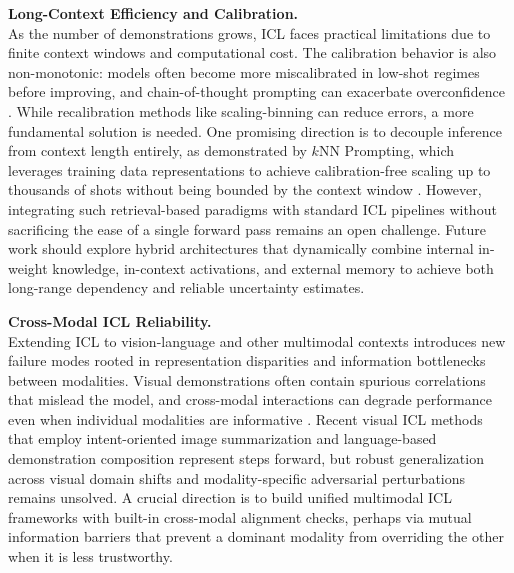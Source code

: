 \documentclass[11pt]{article}
\begin{document}
\textbf{Long-Context Efficiency and Calibration.}\\
As the number of demonstrations grows, ICL faces practical limitations due to finite context windows and computational cost. The calibration behavior is also non-monotonic: models often become more miscalibrated in low-shot regimes before improving, and chain-of-thought prompting can exacerbate overconfidence \cite{ref88}. While recalibration methods like scaling-binning can reduce errors, a more fundamental solution is needed. One promising direction is to decouple inference from context length entirely, as demonstrated by \(k\)NN Prompting, which leverages training data representations to achieve calibration-free scaling up to thousands of shots without being bounded by the context window \cite{ref188}. However, integrating such retrieval-based paradigms with standard ICL pipelines without sacrificing the ease of a single forward pass remains an open challenge. Future work should explore hybrid architectures that dynamically combine internal in-weight knowledge, in-context activations, and external memory to achieve both long-range dependency and reliable uncertainty estimates.

\textbf{Cross-Modal ICL Reliability.}\\
Extending ICL to vision-language and other multimodal contexts introduces new failure modes rooted in representation disparities and information bottlenecks between modalities. Visual demonstrations often contain spurious correlations that mislead the model, and cross-modal interactions can degrade performance even when individual modalities are informative \cite{ref185}. Recent visual ICL methods that employ intent-oriented image summarization and language-based demonstration composition \cite{ref159} represent steps forward, but robust generalization across visual domain shifts and modality-specific adversarial perturbations remains unsolved. A crucial direction is to build unified multimodal ICL frameworks with built-in cross-modal alignment checks, perhaps via mutual information barriers that prevent a dominant modality from overriding the other when it is less trustworthy.
\end{document}
